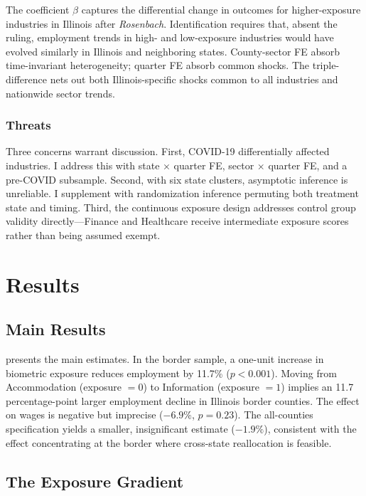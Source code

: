 \documentclass[12pt]{article}
\begin{document}
The coefficient $\beta$ captures the differential change in outcomes for higher-exposure industries in Illinois after \textit{Rosenbach}. Identification requires that, absent the ruling, employment trends in high- and low-exposure industries would have evolved similarly in Illinois and neighboring states. County-sector FE absorb time-invariant heterogeneity; quarter FE absorb common shocks. The triple-difference nets out both Illinois-specific shocks common to all industries and nationwide sector trends.

\subsubsection*{Threats} Three concerns warrant discussion. First, COVID-19 differentially affected industries. I address this with state $\times$ quarter FE, sector $\times$ quarter FE, and a pre-COVID subsample. Second, with six state clusters, asymptotic inference is unreliable. I supplement with randomization inference permuting both treatment state and timing. Third, the continuous exposure design addresses control group validity directly---Finance and Healthcare receive intermediate exposure scores rather than being assumed exempt.

\section{Results}
\label{sec:results}

\subsection{Main Results}

 presents the main estimates. In the border sample, a one-unit increase in biometric exposure reduces employment by 11.7\% ($p < 0.001$). Moving from Accommodation (exposure $= 0$) to Information (exposure $= 1$) implies an 11.7 percentage-point larger employment decline in Illinois border counties. The effect on wages is negative but imprecise ($-6.9\%$, $p = 0.23$). The all-counties specification yields a smaller, insignificant estimate ($-1.9\%$), consistent with the effect concentrating at the border where cross-state reallocation is feasible.



\subsection{The Exposure Gradient}
\end{document}
